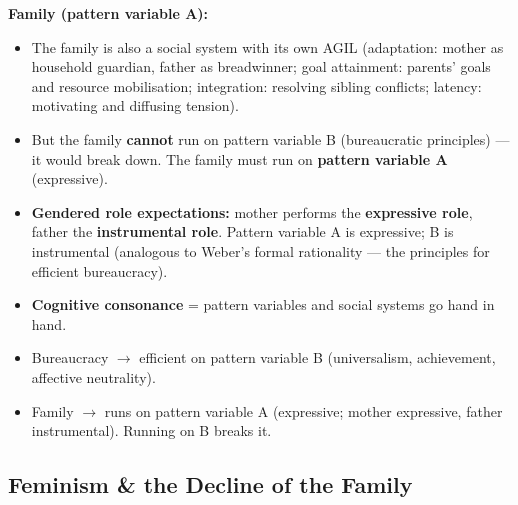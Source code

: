 \begin{ComparisonBox}
\textbf{Family (pattern variable A):}
\begin{itemize}
\item The family is also a social system with its own AGIL (adaptation: mother as household guardian, father as breadwinner; goal attainment: parents' goals and resource mobilisation; integration: resolving sibling conflicts; latency: motivating and diffusing tension).
\item But the family \textbf{cannot} run on pattern variable B (bureaucratic principles) --- it would break down. The family must run on \textbf{pattern variable A} (expressive).
\item \textbf{Gendered role expectations:} mother performs the \textbf{expressive role}, father the \textbf{instrumental role}. Pattern variable A is expressive; B is instrumental (analogous to Weber's formal rationality --- the principles for efficient bureaucracy).
\end{itemize}
\end{ComparisonBox}

\begin{QuickRevision}
\begin{itemize}
\item \textbf{Cognitive consonance} = pattern variables and social systems go hand in hand.
\item Bureaucracy $\rightarrow$ efficient on pattern variable B (universalism, achievement, affective neutrality).
\item Family $\rightarrow$ runs on pattern variable A (expressive; mother expressive, father instrumental). Running on B breaks it.
\end{itemize}
\end{QuickRevision}

\sectiondivider

\subsection{Feminism \& the Decline of the Family}

